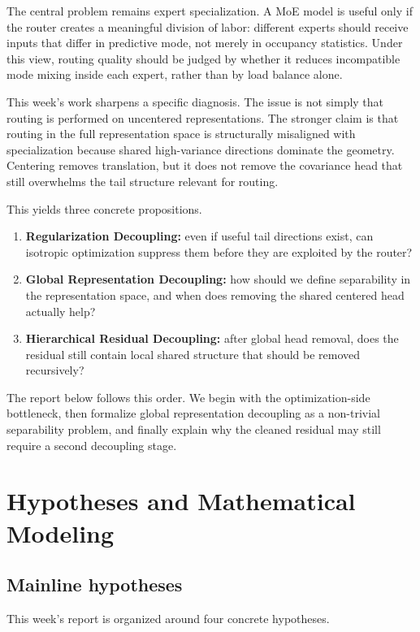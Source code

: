\documentclass[11pt]{article}
\begin{document}
The central problem remains expert specialization. A MoE model is useful only if the router creates a meaningful division of labor: different experts should receive inputs that differ in predictive mode, not merely in occupancy statistics. Under this view, routing quality should be judged by whether it reduces incompatible mode mixing inside each expert, rather than by load balance alone.

This week's work sharpens a specific diagnosis. The issue is not simply that routing is performed on uncentered representations. The stronger claim is that routing in the full representation space is structurally misaligned with specialization because shared high-variance directions dominate the geometry. Centering removes translation, but it does not remove the covariance head that still overwhelms the tail structure relevant for routing.

This yields three concrete propositions.
\begin{enumerate}[leftmargin=1.5em]
    \item \textbf{Regularization Decoupling:} even if useful tail directions exist, can isotropic optimization suppress them before they are exploited by the router?
    \item \textbf{Global Representation Decoupling:} how should we define separability in the representation space, and when does removing the shared centered head actually help?
    \item \textbf{Hierarchical Residual Decoupling:} after global head removal, does the residual still contain local shared structure that should be removed recursively?
\end{enumerate}

The report below follows this order. We begin with the optimization-side bottleneck, then formalize global representation decoupling as a non-trivial separability problem, and finally explain why the cleaned residual may still require a second decoupling stage.

\section{Hypotheses and Mathematical Modeling}

\subsection{Mainline hypotheses}

This week's report is organized around four concrete hypotheses.
\end{document}
